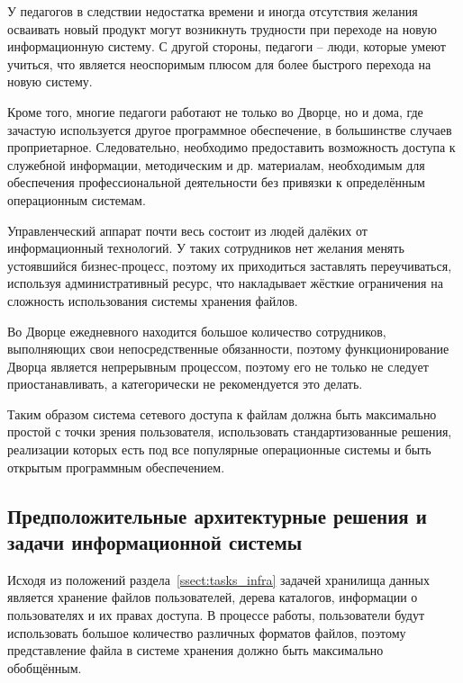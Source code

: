 \documentclass[utf8,usehyperref,12pt]{G7-32}
\begin{document}
У педагогов в следствии недостатка времени и иногда отсутствия желания осваивать новый продукт могут возникнуть трудности при переходе на новую информационную систему. С другой стороны, педагоги – люди, которые умеют учиться, что является неоспоримым плюсом для более быстрого перехода на новую систему.

Кроме того, многие педагоги работают не только во Дворце, но и дома, где зачастую используется другое программное обеспечение, в большинстве случаев проприетарное. Следовательно, необходимо предоставить возможность доступа к служебной информации, методическим и др. материалам, необходимым для обеспечения профессиональной деятельности без привязки к определённым операционным системам.

Управленческий аппарат почти весь состоит из людей далёких от информационный технологий. У таких сотрудников нет желания менять устоявшийся бизнес-процесс, поэтому их приходиться заставлять переучиваться, используя административный ресурс, что накладывает жёсткие ограничения на сложность использования системы хранения файлов.


Во Дворце ежедневного находится большое количество сотрудников, выполняющих свои непосредственные обязанности, поэтому функционирование Дворца является непрерывным процессом, поэтому его не только не следует приостанавливать,
а категорически не рекомендуется это делать.

Таким образом система сетевого доступа к файлам должна быть максимально простой с точки зрения пользователя, использовать стандартизованные решения, реализации которых есть под все популярные операционные системы и быть открытым программным обеспечением.

\subsection{Предположительные архитектурные решения и задачи информационной системы}
Исходя из положений раздела~\ref{ssect:tasks_infra} задачей хранилища данных является хранение файлов пользователей, дерева каталогов, информации о пользователях и их правах доступа. В процессе работы, пользователи будут использовать большое количество различных форматов файлов, поэтому представление файла в системе хранения должно быть максимально обобщённым. 
\end{document}
